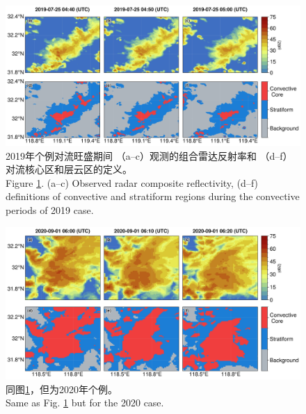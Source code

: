 \clearpage\vspace*{\fill}
\begin{figure}[H]
\centering
\includegraphics[width=\textwidth]{./figures/china_classification_2019.png}
\caption{
2019年个例对流旺盛期间
（a--c）观测的组合雷达反射率和
（d--f）对流核心区和层云区的定义。\\
Figure \ref{fig:china_classification_2019}.
(a--c) Observed radar composite reflectivity,
(d--f) definitions of convective and stratiform regions during the convective periods of 2019 case.
}
\label{fig:china_classification_2019}
\end{figure}

\begin{figure}[H]
\centering
\includegraphics[width=\textwidth]{./figures/china_classification_2020.png}
\caption{
同图\ref{fig:china_classification_2019}，但为2020年个例。\\
Same as Fig. \ref{fig:china_classification_2019} but for the 2020 case.
}
\label{fig:china_classification_2020}
\end{figure}
\vspace*{\fill}\clearpage

